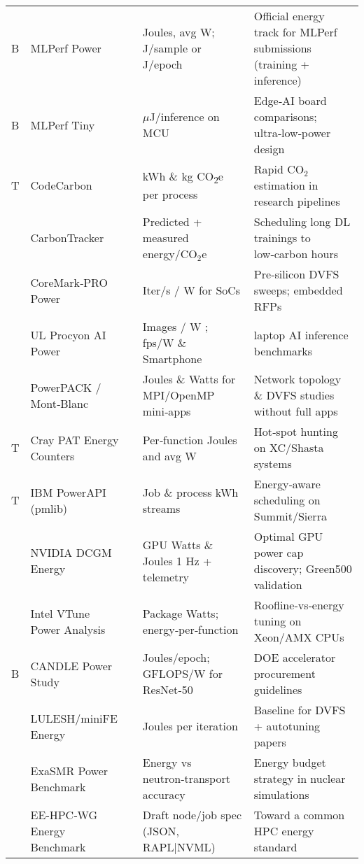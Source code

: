 \begin{table*}[!t]
\begin{tabularx}{0.9\textwidth}{|p{}p{}p{}XX|}
   B & MLPerf Power  & \cite{mlperfpower}                & Joules, avg W; J/sample or J/epoch & Official energy track for MLPerf submissions (training + inference) \\  
   B & MLPerf Tiny  & \cite{mlperftiny}                  & $\mu$J/inference on MCU & Edge‑AI board comparisons; ultra‑low‑power design \\  
   T & CodeCarbon  & \cite{codecarbon}                   & kWh
    \& kg CO\textsubscript{2}e per process & Rapid CO$_2$ estimation in research pipelines \\  
   & CarbonTracker  & \cite{carbontracker}             & Predicted + measured energy/CO$_2$e & Scheduling long DL trainings to low‑carbon hours \\  
   & CoreMark‑PRO Power  & \cite{coremarkpro}          & Iter/s / W for SoCs & Pre‑silicon DVFS sweeps; embedded RFPs \\  
   & UL Procyon AI Power  & \cite{procyon}             & Images / W ; fps/W \& Smartphone & laptop AI inference benchmarks \\  
   & PowerPACK / Mont‑Blanc  & \cite{powerpackmontbl}  & Joules \& Watts for MPI/OpenMP mini‑apps & Network topology \& DVFS studies without full apps \\  
   T & Cray PAT Energy Counters  & \cite{craypatenergyco}& Per‑function Joules and avg W & Hot‑spot hunting on XC/Shasta systems \\  
   T & IBM PowerAPI (pmlib)  & \cite{ibmpowerapipmli}    & Job \& process kWh streams & Energy‑aware scheduling on Summit/Sierra \\  
   & NVIDIA DCGM Energy  & \cite{nvidiadcgmenerg}      & GPU Watts \& Joules \@ 1 Hz + telemetry & Optimal GPU power cap discovery; Green500 validation \\  
   & Intel VTune Power Analysis  & \cite{intelvtunepower}& Package Watts; energy‑per‑function & Roofline‑vs‑energy tuning on Xeon/AMX CPUs \\  
   B & CANDLE Power Study  & \cite{candlepowerstud}      & Joules/epoch; GFLOPS/W for ResNet‑50 & DOE accelerator procurement guidelines \\  
   & LULESH/miniFE Energy  & \cite{luleshminifeene}    & Joules per iteration & Baseline for DVFS + autotuning papers \\  
   & ExaSMR Power Benchmark  & \cite{exasmrpowerbenc}  & Energy vs neutron‑transport accuracy & Energy budget strategy in nuclear simulations \\  
   & EE‑HPC‑WG Energy Benchmark  & \cite{eehpcwgenergybe}& Draft node/job spec (JSON, RAPL|NVML) & Toward a common HPC energy standard \\  

\end{tabularx}
\end{table*}
